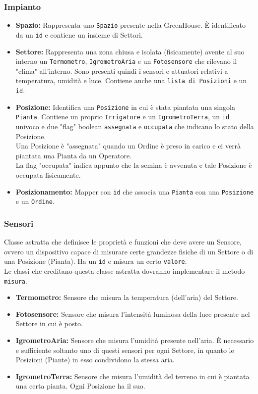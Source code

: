 \documentclass{article}
\newcommand{\code}[1]{\texttt{#1}}
\begin{document}
\subsubsection{Impianto}
\begin{itemize}
    \item \textbf{Spazio:}
    Rappresenta uno \code{Spazio} presente nella GreenHouse.
    È identificato da un \code{id} e contiene un insieme di Settori.
    \item \textbf{Settore:} Rappresenta una zona chiusa e isolata (fisicamente) avente al suo interno un \code{Termometro}, \code{IgrometroAria} e un \code{Fotosensore} che rilevano il "clima" all'interno. Sono presenti quindi i sensori e attuatori relativi a temperatura, umidità e luce. Contiene anche una \code{lista di Posizioni} e un \code{id}.
    \item \textbf{Posizione:}
    Identifica una \code{Posizione} in cui è stata piantata una singola \code{Pianta}.
    Contiene un proprio \code{Irrigatore} e un \code{IgrometroTerra}, un \code{id} univoco e due "flag" boolean \code{assegnata} e \code{occupata} che indicano lo stato della Posizione.\\
    Una Posizione è "assegnata" quando un Ordine è preso in carico e ci verrà piantata una Pianta da un Operatore.\\
    La flag "occupata" indica appunto che la semina è avvenuta e tale Posizione è occupata fisicamente.
    \item \textbf{Posizionamento:}
    Mapper con \code{id} che associa una \code{Pianta} con una \code{Posizione} e un \code{Ordine}.
\end{itemize}

\subsubsection{Sensori}
Classe astratta che definisce le proprietà e funzioni che deve avere un Sensore, ovvero un dispositivo capace di misurare certe grandezze fisiche di un Settore o di una Posizione (Pianta). Ha un \code{id} e misura un certo \code{valore}.\\
Le classi che ereditano questa classe astratta dovranno implementare il metodo \code{misura}.

\begin{itemize}
    \item \textbf{Termometro:}
    Sensore che misura la temperatura (dell'aria) del Settore.
    \item \textbf{Fotosensore:}
    Sensore che misura l'intensità luminosa della luce presente nel Settore in cui è posto.
    \item \textbf{IgrometroAria:}
    Sensore che misura l'umidità presente nell'aria. È necessario e sufficiente soltanto uno di questi sensori per ogni Settore, in quanto le Posizioni (Piante) in esso condividono la stessa aria.    
    \item \textbf{IgrometroTerra:}
    Sensore che misura l'umidità del terreno in cui è piantata una certa pianta. Ogni Posizione ha il suo.
\end{itemize}
\end{document}
